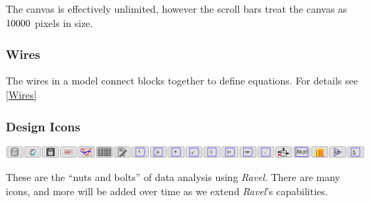 The canvas is effectively unlimited, however the scroll bars treat
the canvas as $10000\time10000$ pixels in size.

\subsubsection{Wires}

The wires in a model connect blocks together to define equations.
For details see \ref{Wires}

\subsubsection{Design Icons}

\includegraphics{images/DesignIcons}

These are the ``nuts and bolts'' of data analysis using \emph{Ravel}.
There are many icons, and more will be added over time as we extend
\emph{Ravel}'s capabilities.

